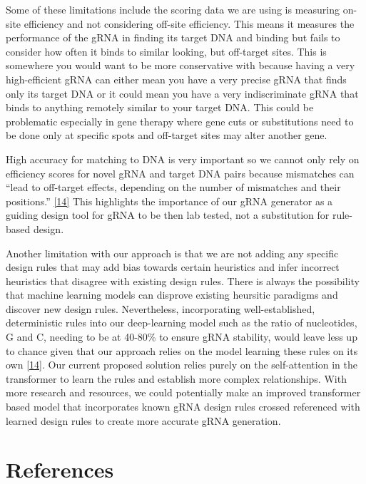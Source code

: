 \documentclass{article}
\begin{document}
Some of these limitations include the scoring data we are using is measuring on-site efficiency and not considering off-site efficiency. This means it measures the performance of the gRNA in finding its target DNA and binding but fails to consider how often it binds to similar looking, but off-target sites. This is somewhere you would want to be more conservative with because having a very high-efficient gRNA can either mean you have a very precise gRNA that finds only its target DNA or it could mean you have a very indiscriminate gRNA that binds to anything remotely similar to your target DNA. This could be problematic especially in gene therapy where gene cuts or substitutions need to be done only at specific spots and off-target sites may alter another gene. 

High accuracy for matching to DNA is very important so we cannot only rely on efficiency scores for novel gRNA and target DNA pairs because mismatches can ``lead to off-target effects, depending on the number of mismatches and their positions.'' \hyperref[Reference 14]{[14]} This highlights the importance of our gRNA generator as a guiding design tool for gRNA to be then lab tested, not a substitution for rule-based design.

Another limitation with our approach is that we are not adding any specific design rules that may add bias towards certain heuristics and infer incorrect heuristics that disagree with existing design rules. There is always the possibility that machine learning models can disprove existing heursitic paradigms and discover new design rules. Nevertheless, incorporating well-established, deterministic rules into our deep-learning model such as the ratio of nucleotides, G and C, needing to be at 40-80\% to ensure gRNA stability, would leave less up to chance given that our approach relies on the model learning these rules on its own \hyperref[Reference 14]{[14]}. Our current proposed solution relies purely on the self-attention in the transformer to learn the rules and establish more complex relationships. With more research and resources, we could potentially make an improved transformer based model that incorporates known gRNA design rules crossed referenced with learned design rules to create more accurate gRNA generation.




\newpage

\section*{References}
\end{document}
